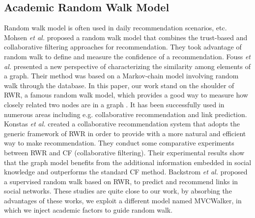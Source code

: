 \documentclass[10pt,journal,compsoc]{IEEEtran}
\begin{document}
\subsection{Academic Random Walk Model}
Random walk model is often used in daily recommendation scenarios, etc. Mohsen \textit{et al.} \cite{Jamali:trustwalker} proposed a random walk model that combines the trust-based and collaborative filtering approaches for recommendation. They took advantage of random walk to define and measure the confidence of a recommendation. Fouss \textit{et al.} \cite{Fouss:RW} presented a new perspective of characterizing the similarity among elements of a graph. Their method was based on a Markov-chain model involving random walk through the database. In this paper, our work stand on the shoulder of RWR, a famous random walk model, which provides a good way to measure how closely related two nodes are in a graph \cite{Tong:RWR}. It has been successfully used in numerous areas including e.g. collaborative recommendation and link prediction. Konstas \textit{et al.} \cite{konstas2009social} created a collaborative recommendation system that adopts the generic framework of RWR in order to provide with a more natural and efficient way to make recommendation. They conduct some comparative experiments between RWR and CF (collaborative filtering). Their experimental results show that the graph model benefits from the additional information embedded in social knowledge and outperforms the standard CF method. Backstrom \textit{et al.} \cite{Backstrom:Supervised} proposed a supervised random walk based on RWR, to predict and recommend links in social networks. These studies are quite close to our work, by absorbing the advantages of these works, we exploit a different model named MVCWalker, in which we inject academic factors to guide random walk.
\end{document}
